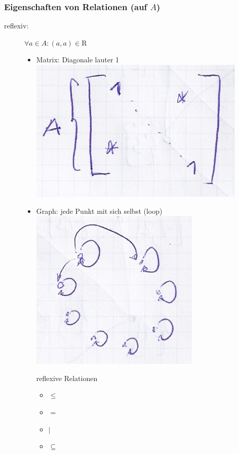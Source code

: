 \subsubsection{Eigenschaften von Relationen (auf \texorpdfstring{$A$}{A})}
\begin{description}
	\item[reflexiv:] $\forall a \in A : (a , a) \in \mathrm{R}$
		\begin{itemize}
			\item Matrix: Diagonale lauter 1 \\
				\includegraphics{Bild17}
			\item Graph: jede Punkt mit sich selbst (loop) \\
				\includegraphics{Bild18} \\
			\begin{bsp*}{reflexive Relationen}\\
				\begin{itemize}
					\item $\leq$
					\item $=$
					\item $|$
					\item $\subseteq$

\end{itemize}
\end{bsp*}
\end{itemize}
\end{description}
